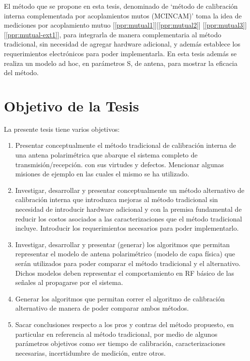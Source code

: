 El método que se propone en esta tesis, denominado de \enquote*{método de calibración interna complementada por acoplamientos 
mutos (MCINCAM)} toma la idea de mediciones por acoplamiento mutuo [\ref{ppr:mutual1}][\ref{ppr:mutual2}] [\ref{ppr:mutual3}]
[\ref{ppr:mutual-ext1}], para integrarla de manera complementaria al método tradicional, sin necesidad de agregar hardware 
adicional, y además establece los requerimientos electrónicos para poder implementarla. En esta tesis además se realiza un modelo 
ad hoc, en parámetros S, de antena, para mostrar la eficacia del método. 


\section{Objetivo de la Tesis}

La presente tesis tiene varios objetivos:

\begin{enumerate}
    \item Presentar conceptualmente el método tradicional de calibración interna de una antena polarimétrica que abarque el 
			sistema completo de transmisión/recepción. con sus virtudes y defectos. Mencionar algunas misiones de ejemplo en
			las cuales el mismo se ha utilizado.
    \item Investigar, desarrollar y presentar conceptualmente un método alternativo de calibración interna que introduzca 
			mejoras al método tradicional sin necesidad de introducir hardware adicional y con la premisa fundamental de 
			reducir los costos asociados a las caracterizaciones que el método tradicional incluye. Introducir los 
			requerimientos necesarios para poder implementarlo.
    \item Investigar, desarrollar y presentar (generar) los algoritmos que permitan representar el modelo de antena 
			polarimétrico (modelo de capa física) que serán utilizados para poder comparar el método tradicional y el 
			alternativo. Dichos modelos deben representar el comportamiento en RF básico de las señales al propagarse por el 
			sistema.
    \item Generar los algoritmos que permitan correr el algoritmo de calibración alternativo de manera de poder comparar ambos 
			métodos.
    \item Sacar conclusiones respecto a los pros y contras del método propuesto, en particular en referencia al método 
			tradicional, por medio de algunos parámetros objetivos como ser tiempo de calibración, caracterizaciones necesarias, 
			incertidumbre de medición, entre otros.
\end{enumerate}    


